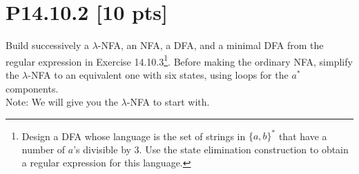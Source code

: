 \documentclass[12pt]{article}
\begin{document}
\section*{\textbf{P14.10.2} [10 pts]}
Build successively a $\lambda$-NFA, an NFA, a DFA, and a minimal DFA from the regular expression in Exercise 14.10.3\footnote{Design a DFA whose language is the set of strings in $\{a, b\}^*$ that have a number of $a$’s divisible by 3. Use the state elimination construction to obtain a regular expression for this language.}. Before making the ordinary NFA, simplify the $\lambda$-NFA to an equivalent one with six states, using loops for the $a^*$ components. \\
Note: We will give you the $\lambda$-NFA to start with. \\
\begin{center}
     \label{1}
\end{center}
\end{document}
